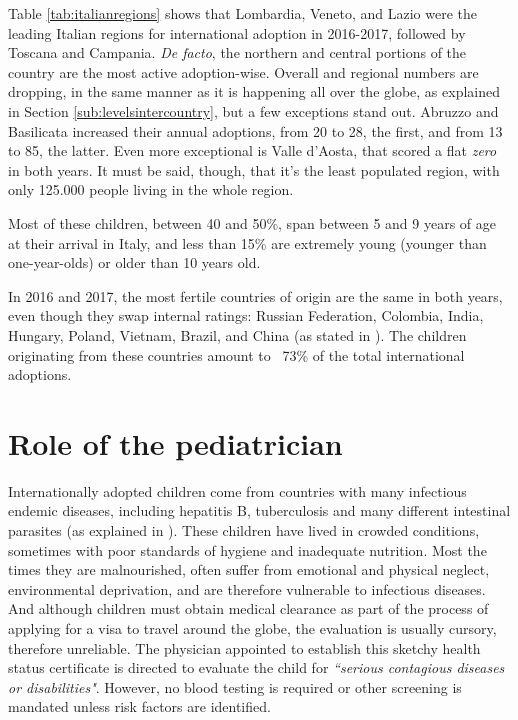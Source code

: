 Table \ref{tab:italianregions} shows that Lombardia, Veneto, and Lazio were the leading Italian regions for international adoption in 2016-2017, followed by Toscana and Campania. \textit{De facto}, the northern and central portions of the country are the most active adoption-wise.  Overall and regional numbers are dropping, in the same manner as it is happening all over the globe, as explained in Section \ref{sub:levelsintercountry}, but a few exceptions stand out. Abruzzo and Basilicata increased their annual adoptions, from 20 to 28, the first, and from 13 to 85, the latter. Even more exceptional is Valle d'Aosta, that scored a flat \textit{zero} in both years. It must be said, though, that it's the least populated region, with only 125.000 people living in the whole region.

Most of these children, between 40 and 50\%, span between 5 and 9 years of age at their arrival in Italy, and less than 15\% are extremely young (younger than one-year-olds) or older than 10 years old. 

In 2016 and 2017, the most fertile countries of origin are the same in both years, even though they swap internal ratings: Russian Federation, Colombia, India, Hungary, Poland, Vietnam, Brazil, and China (as stated in \cite{cai2016}). The children originating from these countries amount to ~73\% of the total international adoptions.

\section{Role of the pediatrician}\label{sec:roleofpediatrician}
Internationally adopted children come from countries with many infectious endemic diseases, including hepatitis B, tuberculosis and many different intestinal parasites (as explained in \cite{caringfor}). These children have lived in crowded conditions, sometimes with poor standards of hygiene and inadequate nutrition. Most the times they are malnourished, often suffer from emotional and physical neglect, environmental deprivation, and are therefore vulnerable to infectious diseases. And although children must obtain medical clearance as part of the process of applying for a visa to travel around the globe, the evaluation is usually cursory, therefore unreliable. The physician appointed to establish this sketchy health status certificate is directed to evaluate the child for \textit{``serious contagious diseases or disabilities"}. However, no blood testing is required or other screening is mandated unless risk factors are identified.

